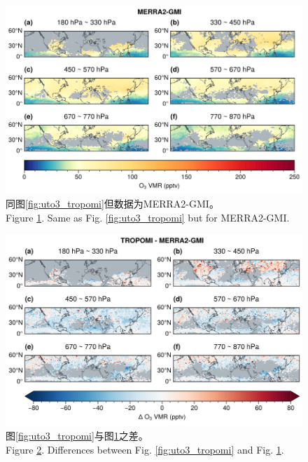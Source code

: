\begin{figure}[H]
    \centering
    \includegraphics[width=\textwidth]{./figures/uto3_merra2-gmi.png}
    \caption{
    同图\ref{fig:uto3_tropomi}但数据为MERRA2-GMI。 \\
    Figure \ref{fig:uto3_merra2}. Same as Fig. \ref{fig:uto3_tropomi} but for MERRA2-GMI.
    }
    \label{fig:uto3_merra2}
\end{figure}


\begin{figure}[H]
    \centering
    \includegraphics[width=\textwidth]{./figures/uto3_delta.png}
    \caption{
    图\ref{fig:uto3_tropomi}与图\ref{fig:uto3_merra2}之差。 \\
    Figure \ref{fig:uto3_delta}. Differences between Fig. \ref{fig:uto3_tropomi} and Fig. \ref{fig:uto3_merra2}.
    }
    \label{fig:uto3_delta}
\end{figure}


